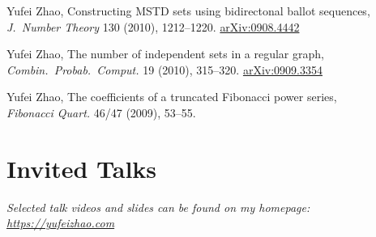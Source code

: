 \documentclass[11pt]{amsart}
\newcommand{\arXiv}[1]{\href{http://arxiv.org/abs/#1}{\color{black!50}\footnotesize\ttfamily  arXiv:#1}}
\renewcommand{\j}[1]{{\frenchspacing\itshape #1}}
\begin{document}
\begin{etaremune}[leftmargin=0.3in,itemsep=4pt,topsep=0pt,partopsep=0pt,parsep=0pt]
\item Yufei Zhao,
  {Constructing MSTD sets using bidirectonal ballot sequences},\\
  \j{J.~Number Theory} {130} (2010), 1212--1220.
  \arXiv{0908.4442}

\item Yufei Zhao,
  {The number of independent sets in a regular graph}, \\
  \j{Combin.~Probab.~Comput.} {19} (2010), 315--320.
  \arXiv{0909.3354}

\item Yufei Zhao,
  {The coefficients of a truncated Fibonacci power series}, \\
  \j{Fibonacci Quart.} {46/47} (2009), 53--55.

\end{etaremune}



\section*{Invited Talks}

\emph{Selected talk videos and slides can be found on my homepage: \url{https://yufeizhao.com}}
\end{document}
